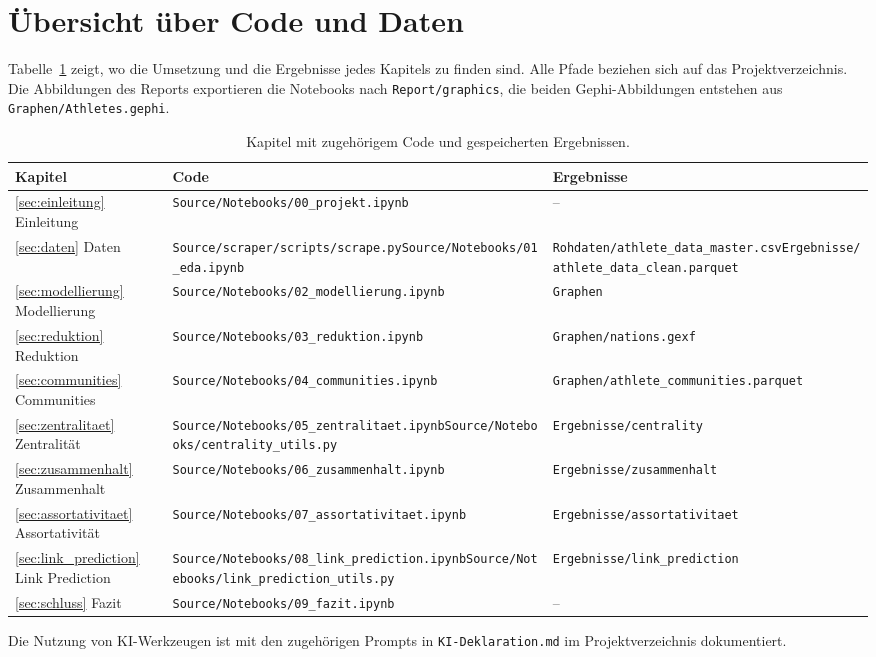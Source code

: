\appendix
\section{Übersicht über Code und Daten}
\label{app:materialien}
Tabelle~\ref{tab:code_daten} zeigt, wo die Umsetzung und die Ergebnisse
jedes Kapitels zu finden sind. Alle Pfade beziehen sich auf das
Projektverzeichnis. Die Abbildungen des Reports exportieren die Notebooks
nach \nolinkurl{Report/graphics}, die beiden Gephi-Abbildungen entstehen
aus \nolinkurl{Graphen/Athletes.gephi}.

\begin{table}[H]
  \centering
  \caption{Kapitel mit zugehörigem Code und gespeicherten Ergebnissen.}
  \label{tab:code_daten}
  \small
  \begin{tabularx}{\textwidth}{@{}l>{\raggedright\arraybackslash}X>{\raggedright\arraybackslash}X@{}}
    \toprule
    Kapitel & Code & Ergebnisse \\
    \midrule
    \ref{sec:einleitung} Einleitung &
      \nolinkurl{Source/Notebooks/00_projekt.ipynb} &
      -- \\
    \ref{sec:daten} Daten &
      \nolinkurl{Source/scraper/scripts/scrape.py}\newline \nolinkurl{Source/Notebooks/01_eda.ipynb} &
      \nolinkurl{Rohdaten/athlete_data_master.csv}\newline \nolinkurl{Ergebnisse/athlete_data_clean.parquet} \\
    \ref{sec:modellierung} Modellierung &
      \nolinkurl{Source/Notebooks/02_modellierung.ipynb} &
      \nolinkurl{Graphen} \\
    \ref{sec:reduktion} Reduktion &
      \nolinkurl{Source/Notebooks/03_reduktion.ipynb} &
      \nolinkurl{Graphen/nations.gexf} \\
    \ref{sec:communities} Communities &
      \nolinkurl{Source/Notebooks/04_communities.ipynb} &
      \nolinkurl{Graphen/athlete_communities.parquet} \\
    \ref{sec:zentralitaet} Zentralität &
      \nolinkurl{Source/Notebooks/05_zentralitaet.ipynb}\newline \nolinkurl{Source/Notebooks/centrality_utils.py} &
      \nolinkurl{Ergebnisse/centrality} \\
    \ref{sec:zusammenhalt} Zusammenhalt &
      \nolinkurl{Source/Notebooks/06_zusammenhalt.ipynb} &
      \nolinkurl{Ergebnisse/zusammenhalt} \\
    \ref{sec:assortativitaet} Assortativität &
      \nolinkurl{Source/Notebooks/07_assortativitaet.ipynb} &
      \nolinkurl{Ergebnisse/assortativitaet} \\
    \ref{sec:link_prediction} Link Prediction &
      \nolinkurl{Source/Notebooks/08_link_prediction.ipynb}\newline \nolinkurl{Source/Notebooks/link_prediction_utils.py} &
      \nolinkurl{Ergebnisse/link_prediction} \\
    \ref{sec:schluss} Fazit &
      \nolinkurl{Source/Notebooks/09_fazit.ipynb} &
      -- \\
    \bottomrule
  \end{tabularx}
\end{table}

Die Nutzung von KI-Werkzeugen ist mit den zugehörigen Prompts in
\nolinkurl{KI-Deklaration.md} im Projektverzeichnis dokumentiert.
